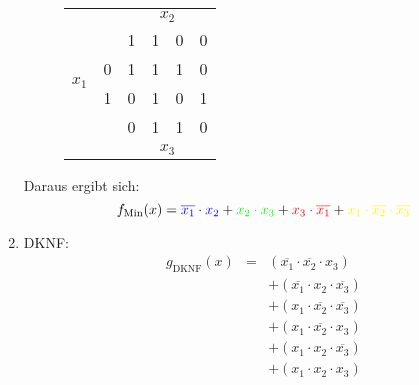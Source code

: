 \documentclass[DIN, pagenumber=false, fontsize=11pt, parskip=half]{scrartcl}
\begin{document}
\begin{enumerate}[label=(\alph*)]
            \begin{figure}[H]
                \centering
                \begin{tabular}{cc|cccc}
                    & &  & \multicolumn{2}{c}{$x_2$}\\
                    & & 1 & 1 & 0 & 0\\
                    \midrule
                    \multirow{ 2}{*}{$x_1$} & 0 & \cellcolor{blue!25}1 & \cellcolor{mixtureColor!25}1 & \cellcolor{red!25}1 & 0\\
                     & 1 & 0 & \cellcolor{green!25}1 & 0 & \cellcolor{yellow!25}1\\
                    \midrule
                    & & 0 & 1 & 1 & 0\\
                    & &  & \multicolumn{2}{c}{$x_3$}\\
                \end{tabular}
            \end{figure}
            Daraus ergibt sich:
            \begin{equation*}
                f_\text{Min}(x) = \textcolor{blue}{\overline{x_1}\cdot x_2} + 
                \textcolor{green}{x_2 \cdot x_3} + 
                \textcolor{red}{x_3 \cdot \overline{x_1}}+
                \textcolor{yellow}{x_1 \cdot \overline{x_2} \cdot \overline{x_3}}
            \end{equation*}
        \item
            DKNF:
            \begin{eqnarray*}
                g_\text{DKNF}(x) &=& (\overline{x_1} \cdot \overline{x_2} \cdot x_3)\\
                &&+ (\overline{x_1} \cdot x_2 \cdot \overline{x_3})\\
                &&+ (x_1 \cdot \overline{x_2} \cdot \overline{x_3})\\
                &&+ (x_1 \cdot \overline{x_2} \cdot x_3)\\
                &&+ (x_1 \cdot x_2  \cdot \overline{x_3})\\
                &&+ (x_1 \cdot x_2 \cdot x_3)
            \end{eqnarray*}


\end{enumerate}
\end{document}
